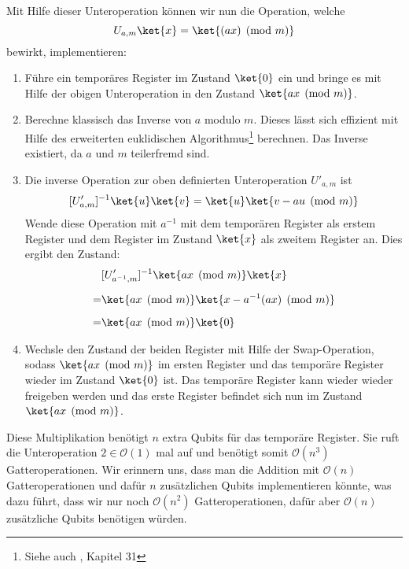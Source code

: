 Mit Hilfe dieser Unteroperation können wir nun die Operation, welche $$U_{a, m}\ket{x} = \ket{(ax) \pmod{m}}$$ bewirkt, implementieren:
\begin{enumerate}
    \item Führe ein temporäres Register im Zustand $\ket{0}$ ein und bringe es mit Hilfe der obigen Unteroperation in den Zustand $\ket{ax \pmod{m}}$.
    \item Berechne klassisch das Inverse von $a$ modulo $m$. Dieses lässt sich effizient mit Hilfe des erweiterten euklidischen Algorithmus\footnote{Siehe auch \cite{clrs}, Kapitel 31} berechnen. Das Inverse existiert, da $a$ und $m$ teilerfremd sind.
    \item Die inverse Operation zur oben definierten Unteroperation $U'_{a, m}$ ist
    $$[U'_{a, m}]^{-1}\ket{u}\ket{v} = \ket{u}\ket{v - au \pmod{m}}$$
    Wende diese Operation mit $a^{-1}$ mit dem temporären Register als erstem Register und dem Register im Zustand $\ket{x}$ als zweitem Register an. Dies ergibt den Zustand: 
    \begin{align*}
        &[U'_{a^{-1}, m}]^{-1}\ket{ax \pmod{m}}\ket{x} \\[0.2cm] = &\ket{ax \pmod{m}}\ket{x - a^{-1}(ax) \pmod{m}} \\[0.2cm] = &\ket{ax \pmod{m}}\ket{0}
    \end{align*}
    \item Wechsle den Zustand der beiden Register mit Hilfe der Swap-Operation, sodass $\ket{ax \pmod{m}}$ im ersten Register und das temporäre Register wieder im Zustand $\ket{0}$ ist. Das temporäre Register kann wieder wieder freigeben werden und das erste Register befindet sich nun im Zustand $\ket{ax \pmod{m}}$.
\end{enumerate}
Diese Multiplikation benötigt $n$ extra Qubits für das temporäre Register. Sie ruft die Unteroperation $2 \in \mathcal O(1)$ mal auf und benötigt somit $\mathcal O(n^3)$ Gatteroperationen. Wir erinnern uns, dass man die Addition mit $\mathcal O(n)$ Gatteroperationen und dafür $n$ zusätzlichen Qubits implementieren könnte, was dazu führt, dass wir nur noch $\mathcal O(n^2)$ Gatteroperationen, dafür aber $\mathcal O(n)$ zusätzliche Qubits benötigen würden.